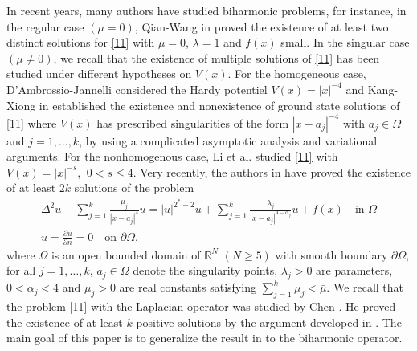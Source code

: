 \documentclass[reqno]{amsart}
\begin{document}
In recent years, many authors have studied biharmonic problems, for instance, in the regular case \((\mu=0)\), Qian-Wang in \cite{bh2} proved the existence of at least two distinct solutions for \eqref{11} with \(\mu=0\), \(\lambda=1\) and \(f(x)\) small. In the singular case \((\mu \neq 0)\), we recall that the existence of multiple solutions of \eqref{11} has been studied under different hypotheses on \(V(x)\). For the homogeneous case, D'Ambrossio-Jannelli \cite{j1} considered the Hardy potentiel \(V(x)=|x|^{-4}\) and Kang-Xiong in \cite{b5} established the existence and nonexistence of ground state solutions of \eqref{11} where \(V(x)\) has prescribed singularities of the form \(|x-a_j|^{-4}\) with \(a_j \in \Omega\) and \(j=1, \dots,k\), by using a complicated asymptotic analysis and variational arguments. For the nonhomogenous case, Li et al. \cite{bt} studied \eqref{11} with \(V(x)=|x|^{-s}\), \(\ 0<s\leq 4 \).
Very recently, the authors in \cite{ms} have proved the existence of at least \(2k\)
solutions of the problem
\begin{gather*}
\Delta^2u- \sum_{j=1}^{k} \frac{\mu_j}{|x-a_j|^4}u=|u|^{2^*-2}u
+\sum_{j=1}^{k} \frac{\lambda_j}{|x-a_j|^{4-\alpha_j}}u+ f(x) \quad \text{in }\Omega \\
u= \frac{\partial u}{\partial n}=0 \quad\text{on }\partial \Omega ,
\end{gather*}
where \(\Omega \) is an open bounded domain of
\( \mathbb{R} ^N\) \((N\geq 5)\) with smooth boundary \(\partial \Omega, \) for all
\(j=1, \dots ,k\), \(a_j\in \Omega\) denote the singularity points, \(\lambda_j>0\)
are parameters, \(0<\alpha_j<4\) and \(\mu_j>0\) are real constants satisfying
\(\sum_{j=1}^{k} \mu_j< \bar{\mu}\).
We recall that the problem \eqref{11} with the Laplacian operator was studied by
Chen \cite{c1}. He proved the existence of at least $k$ positive solutions by the
argument developed in \cite{t}. The main goal of this paper is to generalize the
result in \cite{c1} to the biharmonic operator.
\end{document}
